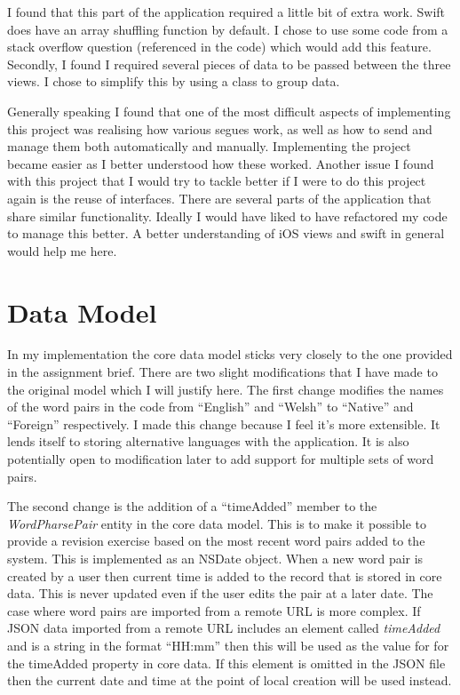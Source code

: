 \documentclass[paper=a4, fontsize=11pt]{scrartcl}	%
\numberwithin{equation}{section}															%
\numberwithin{figure}{section}																%
\numberwithin{table}{section}
\begin{document}
I found that this part of the application required a little bit of extra work. Swift does have an array shuffling function by default. I chose to use some code from a stack overflow question (referenced in the code) which would add this feature. Secondly, I found I required several pieces of data to be passed between the three views. I chose to simplify this by using a class to group data.

Generally speaking I found that one of the most difficult aspects of implementing this project was realising how various segues work, as well as how to send and manage them both automatically and manually. Implementing the project became easier as I better understood how these worked. Another issue I found with this project that I would try to tackle better if I were to do this project again is the reuse of interfaces. There are several parts of the application that share similar functionality. Ideally I would have liked to have refactored my code to manage this better. A better understanding of iOS views and swift in general would help me here.

\section{Data Model}
In my implementation the core data model sticks very closely to the one provided in the assignment brief. There are two slight modifications that I have made to the original model which I will justify here. The first change modifies the names of the word pairs in the code from ``English'' and ``Welsh'' to ``Native'' and ``Foreign'' respectively. I made this change because I feel it's more extensible. It lends itself to storing alternative languages with the application. It is also potentially open to modification later to add support for multiple sets of word pairs. 

The second change is the addition of a ``timeAdded'' member to the \textit{WordPharsePair} entity in the core data model. This is to make it possible to provide a revision exercise based on the most recent word pairs added to the system. This is implemented as an NSDate object. When a new word pair is created by a user then current time is added to the record that is stored in core data. This is never updated even if the user edits the pair at a later date. The case where word pairs are imported from a remote URL is more complex. If JSON data imported from a remote URL includes an element called \textit{timeAdded} and is a string in the format ``HH:mm'' then this will be used as the value for for the timeAdded property in core data. If this element is omitted in the JSON file then the current date and time at the point of local creation will be used instead. 
\end{document}
